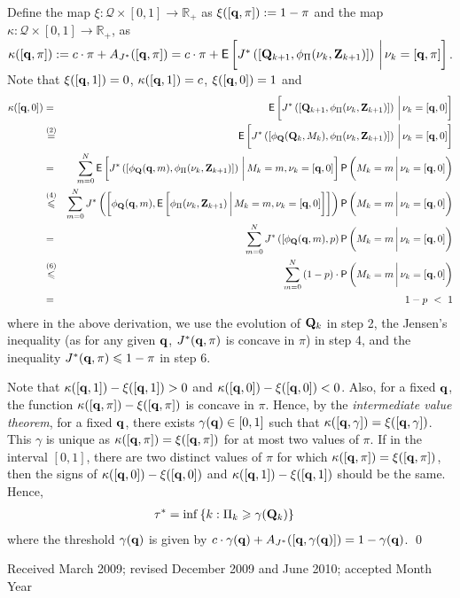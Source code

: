 \documentclass[acmtosn]{acmtrans2m}
\newcommand{\prob}[1]{\mathsf{P}\left(#1\right)}
\begin{document}
Define the map $\xi:\mathcal{Q}\times[0,1] \to \mathbb{R}_+$ 
as $\xi([{\bf q},\pi]) := 1 - \pi$ and the map 
$\kappa:\mathcal{Q}\times[0,1] \to \mathbb{R}_+$, as 
$\kappa([{\bf q},\pi]) := c\cdot\pi + A_{J^*}([{\bf q},\pi]) 
  =   c\cdot\pi + {\sf E}\left[J^*\left([{\bf Q}_{k+1},
\phi_{\Pi}(\nu_k,{\bf Z}_{k+1})]\right)\bigg\arrowvert \nu_k = [{\bf
q},\pi]\right]$.
Note that $\xi([{\bf q},1]) =  0$, $\kappa([{\bf q}, 1]) =  c$, 
$\xi([{\bf q},0]) =   1$ and 
\begin{eqnarray*} 
\kappa([{\bf q},0]) & = &  {\sf E}\left[J^*\left([{\bf Q}_{k+1}, \phi_{\Pi}(\nu_k,{\bf Z}_{k+1})]\right)\bigg\arrowvert \nu_k = [{\bf q},0]\right] \\
 & \stackrel{(2)}{=} &  {\sf E}\left[J^*\left([\phi_{\bf Q}({\bf Q}_{k},M_k), \phi_{\Pi}(\nu_k,{\bf Z}_{k+1})]\right)\bigg\arrowvert \nu_k = [{\bf q},0]\right] \\
& = &  \sum_{m=0}^N {\sf E}\left[J^*\left([\phi_{\bf Q}({\bf q},m), \phi_{\Pi}(\nu_k,{\bf Z}_{k+1})]\right)\bigg\arrowvert M_k = m, \nu_k = [{\bf q},0]\right] \prob{M_k = m \bigg\arrowvert \nu_k = [{\bf q},0]}\\
 & \stackrel{(4)}{\leqslant} &  \sum_{m=0}^N J^*\left(\left[\phi_{\bf Q}({\bf q},m), 
{\sf E}\left[\phi_{\Pi}(\nu_k,{\bf Z}_{k+1})
\bigg\arrowvert M_k = m, \nu_k = [{\bf q},0]\right]
\right]\right)
 \prob{M_k = m \bigg\arrowvert \nu_k = [{\bf q},0]}\\
 & = &  \sum_{m=0}^N J^*\left([\phi_{\bf Q}({\bf q},m), p\right) \prob{M_k = m \bigg\arrowvert \nu_k = [{\bf q},0]}\\
 & \stackrel{(6)}{\leqslant} &  \sum_{m=0}^N \left(1-p\right) \cdot \prob{M_k = m \bigg\arrowvert \nu_k = [{\bf q},0]}\\
& = & 1 - p  \ < \ 1
\end{eqnarray*}
where in the above derivation, 
we use the evolution of ${\bf Q}_k$ in step 2, the Jensen's inequality (as
for any given ${\bf q}$, $J^*({\bf q},\pi)$ is concave in $\pi$) in step 4, and 
the inequality $J^*({\bf q},\pi) \leqslant 1-\pi$ in step 6. 


Note that  $\kappa([{\bf q}, 1]) - \xi([{\bf q},1]) > 0$ and 
$\kappa([{\bf q}, 0]) - \xi([{\bf q},0]) <  0$. Also, for a fixed ${\bf q}$, 
the function $\kappa([{\bf q},\pi]) - \xi([{\bf q}, \pi])$ is concave in $\pi$.
Hence, by the {\em intermediate value theorem}, for a fixed ${\bf q}$, 
there exists $\gamma({\bf q}) \in [0,1]$ such that $\kappa([{\bf q},\gamma]) = 
\xi([{\bf q},\gamma])$.
This $\gamma$ is unique as $\kappa([{\bf q},\pi]) = \xi([{\bf q},\pi])$ for at most two values of $\pi$. 
If in the interval $[0,1]$, there are two distinct values of $\pi$ for 
which $\kappa([{\bf q},\pi]) = \xi([{\bf q}, \pi])$, then the signs of 
$\kappa([{\bf q},0]) - \xi([{\bf q}, 0])$ and
$\kappa([{\bf q},1]) - \xi([{\bf q}, 1])$
should be the same.
Hence, 
\begin{align*} 
\tau^* & = \inf\left\{k: \Pi_k \geqslant \gamma({\bf Q}_k)\right\}
\end{align*}
where the threshold $\gamma({\bf q})$ is given by
$c\cdot\gamma({\bf q}) + A_{J^*}([{\bf q},\gamma({\bf q})]) = 1 -
\gamma({\bf q})$. \qed




 


\begin{received}
Received March 2009;
revised December 2009 and June 2010; accepted Month Year
\end{received}
\end{document}

